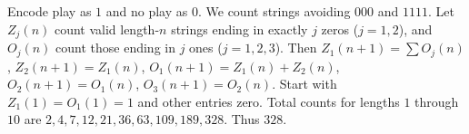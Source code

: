 Encode play as $1$ and no play as $0$. We count strings avoiding $000$ and $1111$. Let $Z_j(n)$ count valid length-$n$ strings ending in exactly $j$ zeros ($j=1,2$), and $O_j(n)$ count those ending in $j$ ones ($j=1,2,3$). Then $Z_1(n+1)=\sum O_j(n)$, $Z_2(n+1)=Z_1(n)$, $O_1(n+1)=Z_1(n)+Z_2(n)$, $O_2(n+1)=O_1(n)$, $O_3(n+1)=O_2(n)$. Start with $Z_1(1)=O_1(1)=1$ and other entries zero. Total counts for lengths $1$ through $10$ are $2,4,7,12,21,36,63,109,189,328$. Thus $\boxed{328}$.
